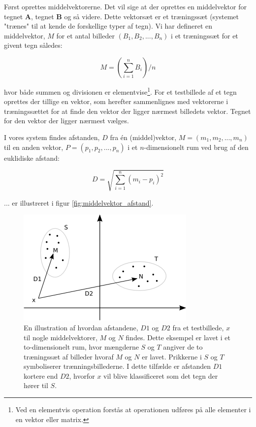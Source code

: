 Først oprettes middelvektorerne. Det vil sige at der oprettes en middelvektor for tegnet \textbf{A}, tegnet \textbf{B} og så videre. Dette vektorsæt er et træningssæt (systemet "trænes" til at kende de forskellige typer af tegn). Vi har defineret en middelvektor, $M$ for et antal billeder $(B_{1},B_{2},...,B_{n})$ i et træningssæt for et givent tegn således:

\begin{displaymath}
	M = (\sum_{i=1}^{n}B_i)/n
\end{displaymath}


hvor både summen og divisionen er elementvise\footnote{Ved en elementvis operation forstås at operationen udføres på alle elementer i en vektor eller matrix.}. For et testbillede af et tegn oprettes der tillige en vektor, som herefter sammenlignes med vektorerne i træningssættet for at finde den vektor der ligger nærmest billedets vektor. Tegnet for den vektor der ligger nærmest vælges.

I vores system findes afstanden, $D$ fra én (middel)vektor, $M = (m_{1},m_{2},...,m_{n})$ til en anden vektor, $P = (p_{1},p_{2},...,p_{n})$ i et $n$-dimensionelt rum ved brug af den euklidiske afstand\cite{wiki_euclid}:

\begin{displaymath}
	D = \sqrt{\sum_{i=1}^{n}(m_{i}-p_{i})^{2}}
\end{displaymath}

... er illustreret i figur \vref{fig:middelvektor_afstand}.

\begin{figure}[htp]
\centering
\includegraphics{system/illu/middelvektor_afstand.png} 
\caption{En illustration af hvordan afstandene, $D1$ og $D2$ fra et testbillede, $x$ til nogle middelvektorer, $M$ og $N$ findes. Dette eksempel er lavet i et to-dimensionelt rum, hvor mængderne $S$ og $T$ angiver de to træningssæt af billeder hvoraf $M$ og $N$ er lavet. Prikkerne i $S$ og $T$ symboliserer trænningsbillederne. I dette tilfælde er afstanden $D1$ kortere end $D2$, hvorfor $x$ vil blive klassificeret som det tegn der hører til $S$.}
\label{fig:middelvektor_afstand}
\end{figure}

